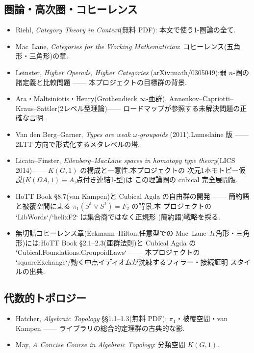 \documentclass[11pt]{ltjsarticle}
\begin{document}
\subsection{圏論・高次圏・コヒーレンス}
\begin{itemize}[leftmargin=1.5em]
\item Riehl, \emph{Category Theory in Context}(無料 PDF):
本文で使う1-圏論の全て.
\item Mac~Lane, \emph{Categories for the Working Mathematician}:
コヒーレンス(五角形・三角形)の章.
\item Leinster, \emph{Higher Operads, Higher Categories}
(arXiv:math/0305049):弱 $n$-圏の諸定義と比較問題 ——
本プロジェクトの目標群の背景.
\item Ara・Maltsiniotis・Henry(Grothendieck $\infty$-亜群),
Annenkov--Capriotti--Kraus--Sattler(2レベル型理論)——
ロードマップが参照する未解決問題の正確な言明.
\item Van den Berg--Garner, \emph{Types are weak $\omega$-groupoids}
(2011),Lumsdaine 版 —— 2LTT 方向で形式化するメタレベルの塔.
\item Licata--Finster, \emph{Eilenberg--MacLane spaces in homotopy type
theory}(LICS 2014)—— $K(G,1)$ の構成と一意性.本プロジェクトの
次元1ホモトピー仮説($K(\Omega A,1)\equiv A$,点付き連結1-型)は
この理論圏の cubical 完全展開版.
\item HoTT Book \S8.7(van Kampen)と Cubical Agda の自由群の開発
—— 簡約語と被覆空間による $\pi_1(S^1\vee S^1)=F_2$ の背景.本
プロジェクトの `LibWords`/`helixF2` は集合商ではなく正規形
(簡約語)戦略を採る.
\item 無切詰コヒーレンス章(Eckmann--Hilton,任意型での Mac~Lane
五角形・三角形)には:HoTT Book \S2.1--2.3(亜群法則)と Cubical
Agda の `Cubical.Foundations.GroupoidLaws` —— 本プロジェクトの
`squareExchange`/動く中点イディオムが洗練するフィラー・接続証明
スタイルの出典.
\end{itemize}

\subsection{代数的トポロジー}
\begin{itemize}[leftmargin=1.5em]
\item Hatcher, \emph{Algebraic Topology} \S\S1.1--1.3(無料 PDF):
$\pi_1$・被覆空間・van Kampen —— ライブラリの総合的定理群の古典的な影.
\item May, \emph{A Concise Course in Algebraic Topology}:
分類空間 $K(G,1)$.
\end{itemize}
\end{document}
